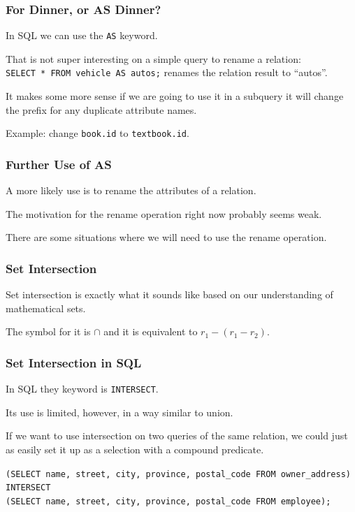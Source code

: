 \begin{frame}
\frametitle{For Dinner, or AS Dinner?}

In SQL we can use the \texttt{AS} keyword. 

That is not super interesting on a simple query to rename a relation:\\
 \texttt{SELECT * FROM vehicle AS autos;} renames the relation result to ``autos''.
 
 It makes some more sense if we are going to use it in a subquery it will change the prefix for any duplicate attribute names.
 
 Example: change \texttt{book.id} to \texttt{textbook.id}.



\end{frame}


\begin{frame}
\frametitle{Further Use of AS}

A more likely use is to rename the attributes of a relation.

The motivation for the rename operation right now probably seems weak. 

There are some situations where we will need to use the rename operation.

\end{frame}




\begin{frame}
\frametitle{Set Intersection}

\alert{Set intersection} is exactly what it sounds like based on our understanding of mathematical sets. 

The symbol for it is $\cap$ and it is equivalent to $r_{1} - (r_{1} - r_{2})$.

\end{frame}



\begin{frame}
\frametitle{Set Intersection in SQL}

In SQL they keyword is \texttt{INTERSECT}. 

Its use is limited, however, in a way similar to union. 

If we want to use intersection on two queries of the same relation, we could just as easily set it up as a selection with a compound predicate.

\texttt{(SELECT name, street, city, province, postal\_code FROM owner\_address)\\ 
INTERSECT\\ 
(SELECT name, street, city, province, postal\_code FROM employee);}


\end{frame}




